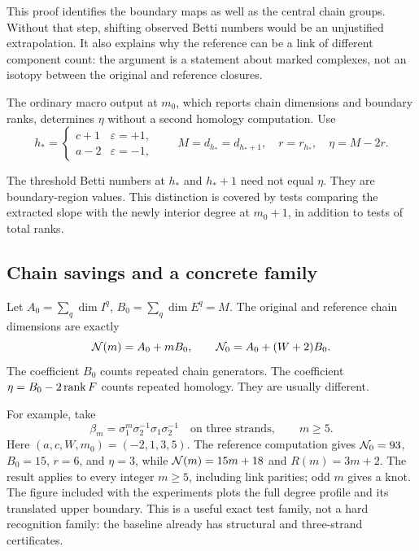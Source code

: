 This proof identifies the boundary maps as well as the central chain
groups. Without that step, shifting observed Betti numbers would be an
unjustified extrapolation. It also explains why the reference can be a
link of different component count: the argument is a statement about
marked complexes, not an isotopy between the original and reference
closures.

\begin{corollary}\label{cor:extraction}
The ordinary macro output at \(m_0\), which reports chain dimensions
and boundary ranks, determines \(\eta\) without a second homology
computation. Use
\[
h_*=\begin{cases}c+1&\varepsilon=+1,\\a-2&\varepsilon=-1,\end{cases}
\qquad
M=d_{h_*}=d_{h_*+1},\quad r=r_{h_*},\quad \eta=M-2r.
\]
\end{corollary}

The threshold Betti numbers at \(h_*\) and \(h_*+1\) need not equal
\(\eta\). They are boundary-region values. This distinction is covered
by tests comparing the extracted slope with the newly interior degree
at \(m_0+1\), in addition to tests of total ranks.

\subsection{Chain savings and a concrete family}

Let \(A_0=\sum_q\dim I^q\), \(B_0=\sum_q\dim E^q=M\).
The original and reference chain dimensions are exactly
\begin{equation}\label{eq:chain-saving}
\mathcal N(m)=A_0+mB_0,\qquad
\mathcal N_0=A_0+(W+2)B_0.
\end{equation}
The coefficient \(B_0\) counts repeated chain generators.
The coefficient \(\eta=B_0-2\operatorname{rank} F\) counts repeated homology.
They are usually different.

For example, take
\[
\beta_m=\sigma_1^m\sigma_2^{-1}\sigma_1\sigma_2^{-1}
\quad\text{on three strands},\qquad m\ge5.
\]
Here \((a,c,W,m_0)=(-2,1,3,5)\). The reference computation gives
\(\mathcal N_0=93\), \(B_0=15\), \(r=6\), and \(\eta=3\), while
\(\mathcal N(m)=15m+18\) and \(R(m)=3m+2\).
The result applies to every integer \(m\ge5\), including link parities;
odd \(m\) gives a knot. The figure included with the experiments plots
the full degree profile and its translated upper boundary.
This is a useful exact test family, not a hard recognition family:
the baseline already has structural and three-strand certificates.
